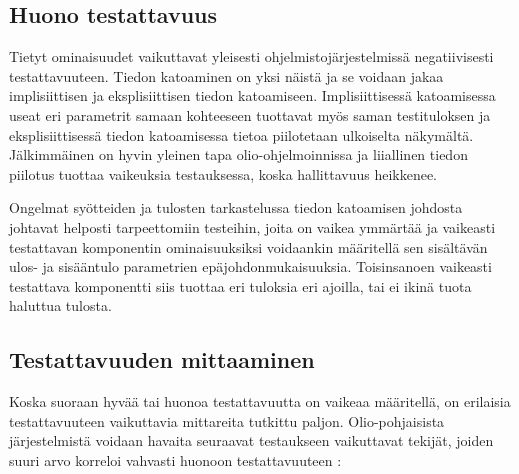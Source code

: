 \documentclass[finnish]{tktltiki2}
\theoremstyle{definition}
\theoremstyle{remark}
\begin{document}
\subsection{Huono testattavuus}

Tietyt ominaisuudet vaikuttavat yleisesti ohjelmistojärjestelmissä negatiivisesti testattavuuteen. Tiedon katoaminen on yksi näistä \citep[s. 20-22]{Voas:1995:STN:624607.625469} ja se voidaan jakaa implisiittisen ja eksplisiittisen tiedon katoamiseen. Implisiittisessä katoamisessa useat eri parametrit samaan kohteeseen tuottavat myös saman testituloksen ja eksplisiittisessä tiedon katoamisessa tietoa piilotetaan ulkoiselta näkymältä. Jälkimmäinen on hyvin yleinen tapa olio-ohjelmoinnissa ja liiallinen tiedon piilotus tuottaa vaikeuksia testauksessa, koska hallittavuus heikkenee. 

Ongelmat syötteiden ja tulosten tarkastelussa tiedon katoamisen johdosta johtavat helposti tarpeettomiin testeihin, joita on vaikea ymmärtää \citep[s. 554]{Freedman:1991:TSC:126218.126229} ja vaikeasti testattavan komponentin ominaisuuksiksi voidaankin määritellä sen sisältävän ulos- ja sisääntulo parametrien epäjohdonmukaisuuksia. Toisinsanoen vaikeasti testattava komponentti siis tuottaa eri tuloksia eri ajoilla, tai ei ikinä tuota haluttua tulosta.   




\subsection{Testattavuuden mittaaminen}



Koska suoraan hyvää tai huonoa testattavuutta on vaikeaa määritellä, on erilaisia testattavuuteen vaikuttavia mittareita tutkittu paljon. Olio-pohjaisista järjestelmistä voidaan havaita seuraavat testaukseen vaikuttavat tekijät, joiden suuri arvo korreloi vahvasti huonoon testattavuuteen \citep[s. 5]{Dubey:2011:AMM:2020976.2020983}:
\end{document}
